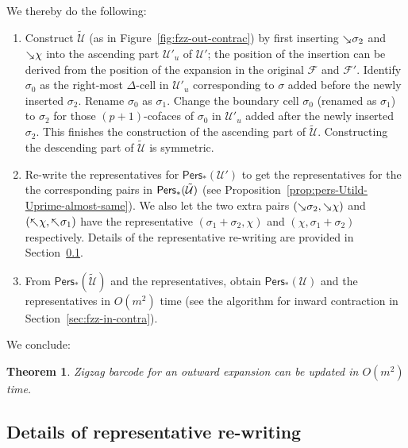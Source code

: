 \documentclass[letterpaper,11pt]{article}
\theoremstyle{mythmstyle}
\newtheorem{theorem}{Theorem}
\theoremstyle{mydefstyle}
\theoremstyle{plain}
\newtheorem{theorem}{Theorem}
\theoremstyle{definition}
\newcommand{\Pers}{\mathsf{Pers}}
\newcommand{\<}[1]{\langle #1\rangle}
\newcommand{\add}[1]{\mskip-2.5mu\rotatebox[origin=c]{-45}{${\rightarrow}$}{#1}}
\newcommand{\del}[1]{\mskip-2.5mu\rotatebox[origin=c]{-45}{${\leftarrow}$}{#1}}
\newcommand{\Fcal}{\mathcal{F}}
\newcommand{\Ucal}{\mathcal{U}}
\newcommand{\DG}{\Delta}
\newcommand{\sG}{\sigma}
\newcommand{\Dim}{p}
\newcommand{\filtcnt}{m}
\newcommand{\extsimp}{\chi}
\begin{document}
We thereby do the following:
\begin{enumerate}
    \item 
    Construct $\tilde{\Ucal}$ (as in Figure~\ref{fig:fzz-out-contrac}) 
    by first
    inserting $\add{\sG_2}$ and $\add{\extsimp}$
    into the ascending part $\Ucal'_u$ of $\Ucal'$;
    the position of the insertion
    can be  derived from the position of the expansion in the original $\Fcal$ and $\Fcal'$.
    Identify $\sG_0$ as the right-most $\DG$-cell in $\Ucal'_u$ 
     corresponding to  $\sG$ 
    added before the newly inserted $\sG_2$.
    Rename $\sG_0$ as $\sG_1$.
    Change
the boundary cell $\sG_0$ (renamed as $\sG_1$)
to $\sG_2$ for those $(\Dim+1)$-cofaces of $\sG_0$
in  $\Ucal'_u$ 
added after the newly inserted  ${\sG_2}$.
This finishes the construction of the ascending part of $\tilde{\Ucal}$.
Constructing the descending part of $\tilde{\Ucal}$
is symmetric.

    
    \item\label{itm:out-expan-rewrite-step}
    Re-write the representatives for $\Pers_*(\Ucal')$
    to get the representatives for the
    the corresponding pairs in $\Pers_*(\Tilde{\Ucal})$
    (see Proposition~\ref{prop:pers-Utild-Uprime-almost-same}).
We also  let the two extra pairs 
$(\add{\sG_2},\add{\extsimp})$ 
and $(\del{\extsimp},\del{\sG_1})$ have the representative
$(\sG_1+\sG_2,\extsimp)$
and
$(\extsimp,\sG_1+\sG_2)$
respectively.
Details of the representative re-writing
are provided in Section~\ref{sec:out-expan-rep-rewri}.

    \item From $\Pers_*(\tilde{\Ucal})$ and the representatives,
    obtain $\Pers_*({\Ucal})$ and the representatives
    in $O(\filtcnt^2)$ time 
    (see the algorithm for inward contraction
    in Section~\ref{sec:fzz-in-contra}). 
\end{enumerate}





We conclude: 

\begin{theorem}
Zigzag barcode for an outward expansion can
be updated in $O(\filtcnt^2)$ time.
\end{theorem}

\subsection{Details of representative re-writing}
\label{sec:out-expan-rep-rewri}
\end{document}
